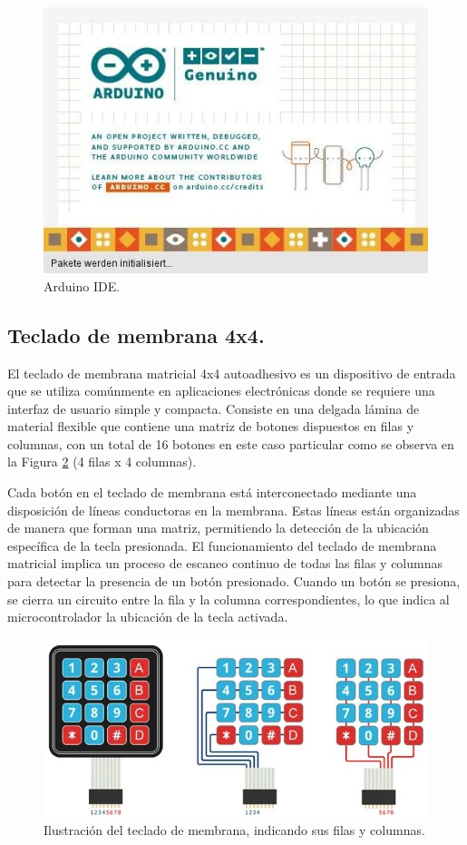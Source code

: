 \begin{figure}[H]
    \centering 
    \includegraphics[scale=0.5]{./imagenes/arduinoIDE.jpg}
    \caption{Arduino IDE.}
    \label{F:arduinoIDE}
\end{figure}

\subsection{Teclado de membrana 4x4.}
El teclado de membrana matricial 4x4 autoadhesivo es un dispositivo de entrada que se utiliza comúnmente en aplicaciones electrónicas donde se requiere una interfaz de usuario simple y compacta. Consiste en una delgada lámina de material flexible que contiene una matriz de botones dispuestos en filas y columnas, con un total de 16 botones en este caso particular como se observa en la Figura \ref{F:teclado4x4} (4 filas x 4 columnas). \par 
Cada botón en el teclado de membrana está interconectado mediante una disposición de líneas conductoras en la membrana. Estas líneas están organizadas de manera que forman una matriz, permitiendo la detección de la ubicación específica de la tecla presionada. El funcionamiento del teclado de membrana matricial implica un proceso de escaneo continuo de todas las filas y columnas para detectar la presencia de un botón presionado. Cuando un botón se presiona, se cierra un circuito entre la fila y la columna correspondientes, lo que indica al microcontrolador la ubicación de la tecla activada.

\begin{figure}[H]
    \centering 
    \includegraphics[scale=0.5]{./imagenes/Teclado Matricial 4x4_2.jpg}
    \caption{Ilustración del teclado de membrana, indicando sus filas y columnas.}
    \label{F:teclado4x4}
\end{figure}

